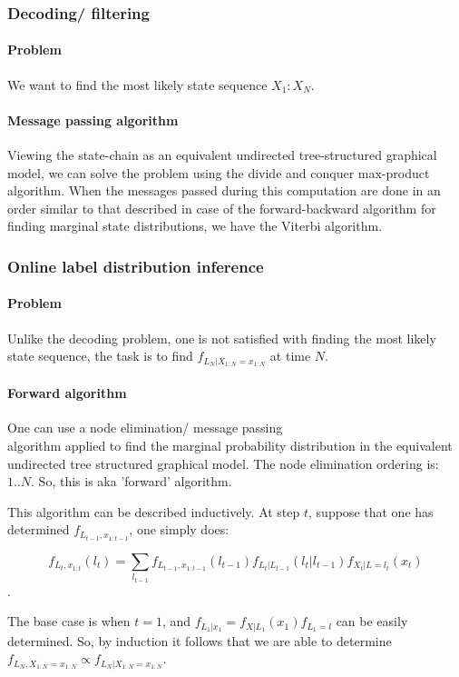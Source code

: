 \documentclass[oneside, article]{memoir}
\begin{document}
\subsubsection{Decoding/ filtering}
\paragraph{Problem}
We want to find the most likely state sequence $X_1:X_N$.

\paragraph{Message passing algorithm}
Viewing the state-chain as an equivalent undirected tree-structured graphical model, we can solve the problem using the divide and conquer max-product algorithm. When the messages passed during this computation are done in an order similar to that described in case of the forward-backward algorithm for finding marginal state distributions, we have the Viterbi algorithm.

\subsubsection{Online label distribution inference}
\paragraph{Problem}
Unlike the decoding problem, one is not satisfied with finding the most likely state sequence, the task is to find $f_{L_N|X_{1:N} = x_{1:N}}$ at time $N$.

\paragraph{Forward algorithm}
One can use a node elimination/ message passing \\
algorithm applied to find the marginal probability distribution in the equivalent undirected tree structured graphical model. The node elimination ordering is: $1 .. N$. So, this is aka 'forward' algorithm.

This algorithm can be described inductively. At step $t$, suppose that one has determined $f_{L_{t-1}, x_{1:t-1}}$, one simply does: 

$$f_{L_t, x_{1:t}}(l_t) = \sum_{l_{t-1}} f_{L_{t-1}, x_{1:t-1}}(l_{t-1}) f_{L_{t}|L_{t-1}}(l_t|l_{t-1}) f_{X_t|L = l_t}(x_t)$$.

The base case is when $t = 1$, and $f_{L_1|x_1} = f_{X|L_1}(x_1)f_{L_1 = l}$ can be easily determined. So, by induction it follows that we are able to determine $f_{L_N, X_{1:N} = x_{1:N}} \propto f_{L_N| X_{1:N} = x_{1:N}}$.
\end{document}
